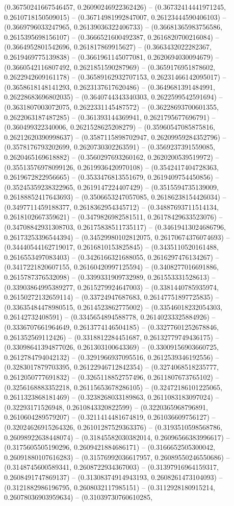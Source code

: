 (0.36750241667546457, 0.26090246922362426) -- (0.36732414441971245, 0.2610718150509015) -- (0.36714981992847007, 0.26123444590406103) -- (0.3669796033247965, 0.26139036322406733) -- (0.36681365983756586, 0.2615395698156107) -- (0.3666521600492387, 0.2616820700216084) -- (0.3664952801542696, 0.261817869915627) -- (0.3663432022282367, 0.2619469775139838) -- (0.3661961145077081, 0.2620694030094679) -- (0.3660542116807492, 0.2621851590287969) -- (0.3659176951878602, 0.2622942609161178) -- (0.36589162932707153, 0.26231466142095017) -- (0.3658618148141293, 0.2623137617620486) -- (0.3649681391484991, 0.26228683696802035) -- (0.3640744343340303, 0.2622599542591694) -- (0.3631807003072075, 0.2622331145487572) -- (0.36228693700601355, 0.2622063187487285) -- (0.361393144369941, 0.2621795677696791) -- (0.360499322340006, 0.2621528625208279) -- (0.35960547085875816, 0.26212620390998637) -- (0.3587115898702947, 0.26209959284352796) -- (0.3578176793202699, 0.2620730302263591) -- (0.3569237391559085, 0.2620465169618882) -- (0.3560297693260162, 0.2620200539519972) -- (0.35513576978099126, 0.2619936420970108) -- (0.3542417404728363, 0.2619672822956665) -- (0.3533476813551679, 0.2619409754450856) -- (0.35245359238322965, 0.2619147224407429) -- (0.3515594735139009, 0.26188852417643693) -- (0.3506653247057085, 0.26186238154426034) -- (0.3497711459188377, 0.2618362954345712) -- (0.34887693711514134, 0.2618102667359621) -- (0.3479826982581511, 0.26178429633523076) -- (0.34708842931308703, 0.26175838511735117) -- (0.34619413024686796, 0.26173253396544394) -- (0.34529980102812075, 0.26170674376074693) -- (0.34440544162719017, 0.2616810153825845) -- (0.3435110520161488, 0.2616553497083403) -- (0.3426166321688055, 0.2616297476134267) -- (0.3417221820607155, 0.26160420997125594) -- (0.3408277016691886, 0.2615787376532098) -- (0.3399331909732989, 0.261553331528613) -- (0.33903864995389277, 0.2615279924647003) -- (0.3381440785935974, 0.26150272132659114) -- (0.33724947687683, 0.26147751897725835) -- (0.33635484478980515, 0.2614523862775002) -- (0.33546018232054303, 0.26142732408591) -- (0.3345654894588778, 0.26140233325884926) -- (0.3336707661964649, 0.2613774146504185) -- (0.33277601252678846, 0.261352569112426) -- (0.3318812284451687, 0.26132779749436175) -- (0.33098641394877026, 0.261303100643369) -- (0.33009156903660725, 0.2612784794042132) -- (0.3291966937095516, 0.2612539346192556) -- (0.3283017879703395, 0.26122946712842354) -- (0.3274068518235777, 0.2612050777691832) -- (0.3265118852757496, 0.2611807673765102) -- (0.3256168883352218, 0.26115653678286105) -- (0.32472186101225065, 0.2611323868181469) -- (0.3238268033189863, 0.2611083183097024) -- (0.32293171526948, 0.2610843320822599) -- (0.3220365968796891, 0.2610604289579207) -- (0.3211414481674819, 0.261036609756127) -- (0.32024626915264326, 0.26101287529363376) -- (0.3193510598568786, 0.26098922638448074) -- (0.31845582030382014, 0.26096566383996617) -- (0.3175605505190296, 0.2609421884686171) -- (0.3166652505300042, 0.26091880107616283) -- (0.31576992036617957, 0.26089550246550686) -- (0.3148745600589341, 0.2608722934367003) -- (0.31397916964159317, 0.2608491747869137) -- (0.31308374914943193, 0.2608261473104093) -- (0.3121882986196795, 0.2608032117985151) -- (0.3112928180915214, 0.26078036903959634) -- (0.31039730760610285, 